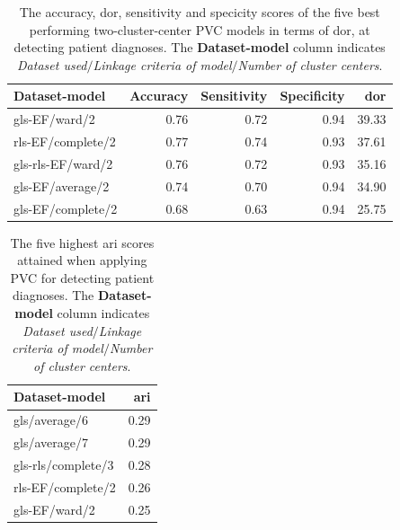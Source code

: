 \begin{table}
    \centering
    \begin{tabular}{lrrrr}
        \toprule
        Dataset-model    &  Accuracy &  Sensitivity &  Specificity &   \acrshort{dor} \\
        \midrule
        gls-EF/ward/2     &      0.76 &         0.72 &         0.94 & 39.33 \\
        rls-EF/complete/2 &      0.77 &         0.74 &         0.93 & 37.61 \\
        gls-rls-EF/ward/2 &      0.76 &         0.72 &         0.93 & 35.16 \\
        gls-EF/average/2  &      0.74 &         0.70 &         0.94 & 34.90 \\
        gls-EF/complete/2 &      0.68 &         0.63 &         0.94 & 25.75 \\
        \bottomrule
    \end{tabular}
    \caption{The accuracy, \acrshort{dor}, sensitivity and specicity scores of the five best performing two-cluster-center PVC models in terms of \acrshort{dor}, at detecting patient diagnoses.
             The \textbf{Dataset-model} column indicates \textit{Dataset used}$/$\textit{Linkage criteria of model}$/$\textit{Number of cluster centers}.}
    \label{tab:pvc_ind_dor_sens_spec_dist}
\end{table}

\begin{table}
    \centering
    \begin{tabular}{lr}
        \toprule
        Dataset-model     &  \acrshort{ari} \\
        \midrule
        gls/average/6      & 0.29 \\
        gls/average/7      & 0.29 \\
        gls-rls/complete/3 & 0.28 \\
        rls-EF/complete/2  & 0.26 \\
        gls-EF/ward/2      & 0.25 \\
        \bottomrule
    \end{tabular}
    \caption{The five highest \acrshort{ari} scores attained when applying PVC for detecting patient diagnoses.
             The \textbf{Dataset-model} column indicates \textit{Dataset used}$/$\textit{Linkage criteria of model}$/$\textit{Number of cluster centers}.}
    \label{tab:pvc_ind_ari}
\end{table}

